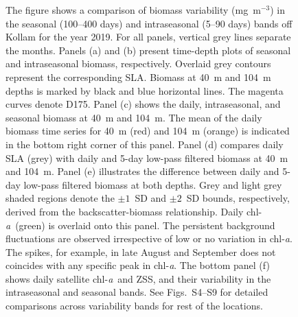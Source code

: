 \documentclass[authoryear,review,11pt]{elsarticle}
\newcommand{\chla}{chl-{\emph{a}}}
\begin{document}
\begin{figure}[htbp]
\begin{adjustwidth}{-0.5in}{0in}
		\caption{The figure shows a comparison of biomass variability (mg~m$^{-3}$) in the seasonal (100--400 days) and intraseasonal (5--90 days) bands off Kollam for the year 2019. For all panels, vertical grey lines separate the months. Panels (a) and (b) present time-depth plots of seasonal and intraseasonal biomass, respectively. Overlaid grey contours represent the corresponding SLA. Biomass at 40~m and 104~m depths is marked by black and blue horizontal lines. The magenta curves denote D175. Panel (c) shows the daily, intraseasonal, and seasonal biomass at 40~m and 104~m. The mean of the daily biomass time series for 40~m (red) and 104~m (orange) is indicated in the bottom right corner of this panel. Panel (d) compares daily SLA (grey) with daily and 5-day low-pass filtered biomass at 40~m and 104~m. Panel (e) illustrates the difference between daily and 5-day low-pass filtered biomass at both depths. Grey and light grey shaded regions denote the $\pm 1$~SD and $\pm 2$~SD bounds, respectively, derived from the backscatter-biomass relationship. Daily \chla\ (green) is overlaid onto this panel. The persistent background fluctuations are observed irrespective of low or no variation in \chla{}. The spikes, for example, in late August and September does not coincides with any specific peak in \chla{}. The bottom panel (f) shows daily satellite \chla\ and ZSS, and their variability in the intraseasonal and seasonal bands. See Figs.~S4--S9 for detailed comparisons across variability bands for rest of the locations.}		
		\label{fig:biomass_intra_2019_kollam}
	\end{adjustwidth}
\end{figure}
\end{document}
